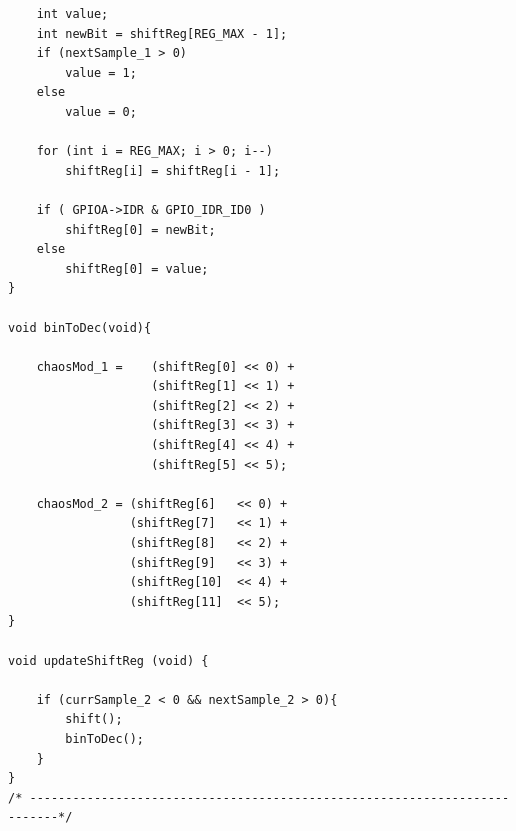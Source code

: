 \documentclass[12pt]{article}
\begin{document}
\begin{verbatim}
    int value;
    int newBit = shiftReg[REG_MAX - 1];
    if (nextSample_1 > 0)
        value = 1;
    else
        value = 0;
		
    for (int i = REG_MAX; i > 0; i--) 
        shiftReg[i] = shiftReg[i - 1];
	
    if ( GPIOA->IDR & GPIO_IDR_ID0 ) 
        shiftReg[0] = newBit;
    else 
        shiftReg[0] = value;
}

void binToDec(void){
	 
    chaosMod_1 =    (shiftReg[0] << 0) +
                    (shiftReg[1] << 1) +
                    (shiftReg[2] << 2) +
                    (shiftReg[3] << 3) +
                    (shiftReg[4] << 4) +
                    (shiftReg[5] << 5);
	
    chaosMod_2 = (shiftReg[6]   << 0) +
                 (shiftReg[7]   << 1) +
                 (shiftReg[8]   << 2) +
                 (shiftReg[9]   << 3) +
                 (shiftReg[10]  << 4) +
                 (shiftReg[11]  << 5);
}

void updateShiftReg (void) {
	
    if (currSample_2 < 0 && nextSample_2 > 0){ 
        shift();
        binToDec();	
    }
}
/* --------------------------------------------------------------------------*/
\end{verbatim}
\newpage
\end{document}
